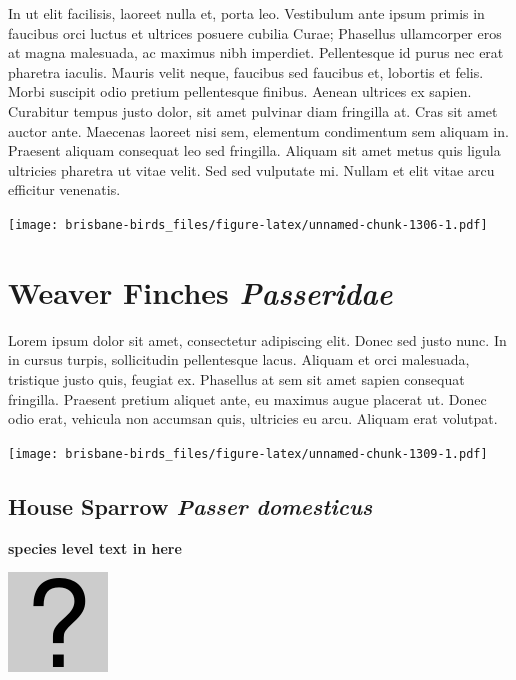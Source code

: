 \documentclass[]{book}
\let\origfigure\figure
\let\endorigfigure\endfigure
\renewenvironment{figure}[1][2] {
  \expandafter\origfigure\expandafter[H]
} {
  \endorigfigure
}
\begin{document}
In ut elit facilisis, laoreet nulla et, porta leo. Vestibulum ante ipsum
primis in faucibus orci luctus et ultrices posuere cubilia Curae;
Phasellus ullamcorper eros at magna malesuada, ac maximus nibh
imperdiet. Pellentesque id purus nec erat pharetra iaculis. Mauris velit
neque, faucibus sed faucibus et, lobortis et felis. Morbi suscipit odio
pretium pellentesque finibus. Aenean ultrices ex sapien. Curabitur
tempus justo dolor, sit amet pulvinar diam fringilla at. Cras sit amet
auctor ante. Maecenas laoreet nisi sem, elementum condimentum sem
aliquam in. Praesent aliquam consequat leo sed fringilla. Aliquam sit
amet metus quis ligula ultricies pharetra ut vitae velit. Sed sed
vulputate mi. Nullam et elit vitae arcu efficitur venenatis.

\begin{figure}
\centering
\texttt{[image: brisbane-birds\_files/figure-latex/unnamed-chunk-1306-1.pdf]}
\caption{\label{fig:unnamed-chunk-1306}insert figure caption}
\end{figure}

\chapter{\texorpdfstring{Weaver Finches
\emph{Passeridae}}{Weaver Finches Passeridae}}\label{weaver-finches-passeridae}

Lorem ipsum dolor sit amet, consectetur adipiscing elit. Donec sed justo
nunc. In in cursus turpis, sollicitudin pellentesque lacus. Aliquam et
orci malesuada, tristique justo quis, feugiat ex. Phasellus at sem sit
amet sapien consequat fringilla. Praesent pretium aliquet ante, eu
maximus augue placerat ut. Donec odio erat, vehicula non accumsan quis,
ultricies eu arcu. Aliquam erat volutpat.

\texttt{[image: brisbane-birds\_files/figure-latex/unnamed-chunk-1309-1.pdf]}

\section{\texorpdfstring{House Sparrow \emph{Passer
domesticus}}{House Sparrow Passer domesticus}}\label{house-sparrow-passer-domesticus}

\textbf{species level text in here}

\begin{figure}
\centering
\includegraphics{assets/missing.png}
\caption{No image for species}
\end{figure}
\end{document}
